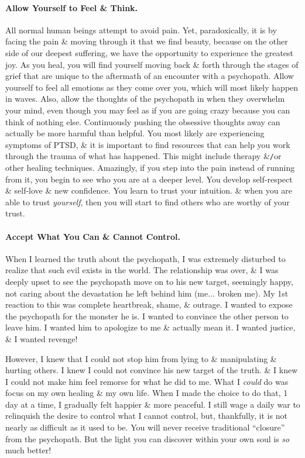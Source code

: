 \documentclass{article}
\numberwithin{equation}{section}
\begin{document}
\paragraph{Allow Yourself to Feel \& Think.} All normal human beings attempt to avoid pain. Yet, paradoxically, it is by facing the pain \& moving through it that we find beauty, because on the other side of our deepest suffering, we have the opportunity to experience the greatest joy. As you heal, you will find yourself moving back \& forth through the stages of grief that are unique to the aftermath of an encounter with a psychopath. Allow yourself to feel all emotions as they come over you, which will most likely happen in waves. Also, allow the thoughts of the psychopath in when they overwhelm your mind, even though you may feel as if you are going crazy because you can think of nothing else. Continuously pushing the obsessive thoughts away can actually be more harmful than helpful. You most likely are experiencing symptoms of PTSD, \& it is important to find resources that can help you work through the trauma of what has happened. This might include therapy \&\texttt{/}or other healing techniques. Amazingly, if you step into the pain instead of running from it, you begin to see who you are at a deeper level. You develop self-respect \& self-love \& new confidence. You learn to trust your intuition. \& when you are able to trust \textit{yourself}, then you will start to find others who are worthy of your trust.

\paragraph{Accept What You Can \& Cannot Control.} When I learned the truth about the psychopath, I was extremely disturbed to realize that such evil exists in the world. The relationship was over, \& I was deeply upset to see the psychopath move on to his new target, seemingly happy, not caring about the devastation he left behind him (me$\ldots$ broken me). My 1st reaction to this was complete heartbreak, shame, \& outrage. I wanted to expose the psychopath for the monster he is. I wanted to convince the other person to leave him. I wanted him to apologize to me \& actually mean it. I wanted justice, \& I wanted revenge!

However, I knew that I could not stop him from lying to \& manipulating \& hurting others. I knew I could not convince his new target of the truth. \& I knew I could not make him feel remorse for what he did to me. What I \textit{could} do was focus on my own healing \& my own life. When I made the choice to do that, 1 day at a time, I gradually felt happier \& more peaceful. I still wage a daily war to relinquish the desire to control what I cannot control, but, thankfully, it is not nearly as difficult as it used to be. You will never receive traditional ``closure'' from the psychopath. But the light you can discover within your own soul is \textit{so} much better!
\end{document}
